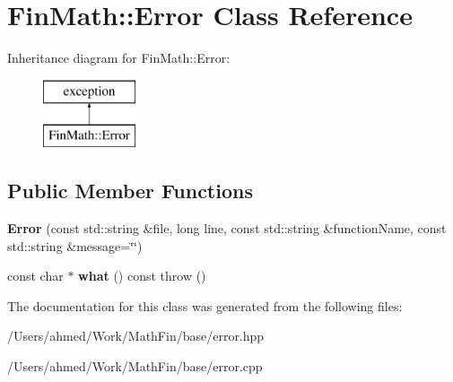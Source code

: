 \hypertarget{class_fin_math_1_1_error}{}\section{Fin\+Math\+:\+:Error Class Reference}
\label{class_fin_math_1_1_error}
Inheritance diagram for Fin\+Math\+:\+:Error\+:\begin{figure}[H]
\begin{center}
\leavevmode
\includegraphics[height=2.000000cm]{class_fin_math_1_1_error}
\end{center}
\end{figure}
\subsection*{Public Member Functions}
\begin{DoxyCompactItemize}
\item 
\hypertarget{class_fin_math_1_1_error_a1ee5c83fabe1111eedf04c1d5ecffec7}{}{\bfseries Error} (const std\+::string \&file, long line, const std\+::string \&function\+Name, const std\+::string \&message=\char`\"{}\char`\"{})\label{class_fin_math_1_1_error_a1ee5c83fabe1111eedf04c1d5ecffec7}

\item 
\hypertarget{class_fin_math_1_1_error_a2ae27c5e00f1c54b2907f3c1ffa73dae}{}const char $\ast$ {\bfseries what} () const   throw ()\label{class_fin_math_1_1_error_a2ae27c5e00f1c54b2907f3c1ffa73dae}

\end{DoxyCompactItemize}


The documentation for this class was generated from the following files\+:\begin{DoxyCompactItemize}
\item 
/\+Users/ahmed/\+Work/\+Math\+Fin/base/error.\+hpp\item 
/\+Users/ahmed/\+Work/\+Math\+Fin/base/error.\+cpp\end{DoxyCompactItemize}
